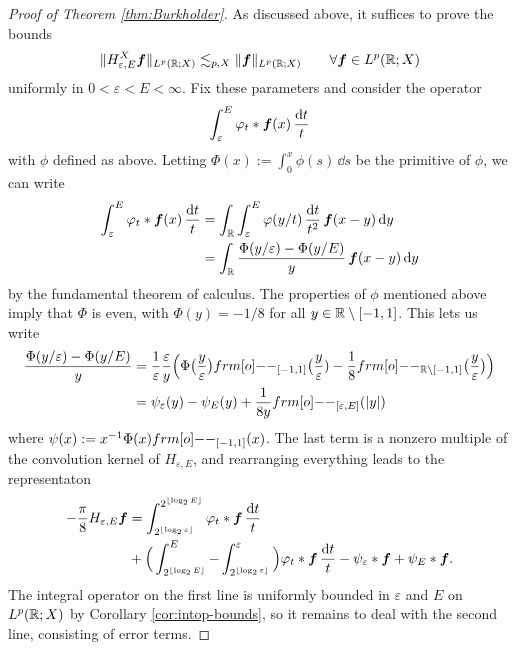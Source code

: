 \begin{proof}[Proof of Theorem \ref{thm:Burkholder}]
  As discussed above, it suffices to prove the bounds
  \begin{equation}\label{eq:HT-unifbds}
    \|H^{X}_{\varepsilon, E} \bm{f}\|_{L^p(\mathbb{R};X)} \lesssim_{p,X} \|\bm{f}\|_{L^p(\mathbb{R};X)} \qquad \forall \bm{f} \in L^p(\mathbb{R};X)
  \end{equation}
  uniformly in $0 < \varepsilon < E < \infty$.
  Fix these parameters and consider the operator
  \begin{equation*}
    \int_{\varepsilon}^{E} \varphi_{t} \ast \bm{f}(x) \, \frac{\mathrm{d} t}{t}
  \end{equation*}
  with $\phi$ defined as above.
  Letting $\Phi(x) := \int_{0}^{x} \phi(s) \, \dd s$ be the primitive of $\phi$, we can write
  \begin{equation*}
    \begin{aligned}
    \int_{\varepsilon}^{E} \varphi_{t} \ast \bm{f}(x) \, \frac{\mathrm{d} t}{t}
    &= \int_{\mathbb{R}} \int_{\varepsilon}^{E} \varphi(y/t) \, \frac{\mathrm{d} t}{t^{2}} \, \bm{f}(x - y) \, \mathrm{d} y \\
    &= \int_{\mathbb{R}} \frac{\Phi(y/\varepsilon) - \Phi(y/E) }{y} \, \bm{f}(x-y) \, \mathrm{d} y
  \end{aligned}
\end{equation*}
by the fundamental theorem of calculus.
The properties of $\phi$ mentioned above imply that $\Phi$ is even, with $\Phi(y) = -1/8$ for all $y \in \mathbb{R} \setminus [-1,1]$.
This lets us write
\begin{equation*}
  \begin{aligned}
    \frac{\Phi(y/\varepsilon) - \Phi(y/E) }{y}
    &= \frac{1}{\varepsilon} \frac{\varepsilon}{y} \Big( \Phi\big(\frac{y}{\varepsilon}\big) \1_{[-1,1]}\big(\frac{y}{\varepsilon}) - \frac{1}{8}\1_{\R \sm [-1,1]}\big(\frac{y}{\varepsilon}\big) \Big) \\
    &= \psi_{\varepsilon}(y) - \psi_{E}(y) + \frac{1}{8y}\1_{[\varepsilon, E]}(|y|)
  \end{aligned}
\end{equation*}
where $\psi(x) := x^{-1} \Phi(x) \1_{[-1,1]}(x)$.
The last term is a nonzero multiple of the convolution kernel of $H_{\varepsilon, E}$, and rearranging everything leads to the representaton
\begin{equation*}
  \begin{aligned}
  -\frac{\pi}{8} H_{\varepsilon, E}\bm{f}
  &= \int_{2^{\lfloor \log_{2} \varepsilon \rfloor}}^{2^{\lfloor \log_{2} E \rfloor}} \varphi_{t} \ast \bm{f} \, \frac{\mathrm{d} t}{t} \\
  &+ \Big( \int_{2^{\lfloor \log_{2} E \rfloor}}^{E} - \int_{2^{\lfloor \log_{2} \varepsilon \rfloor}}^{\varepsilon} \Big) \varphi_{t} \ast \bm{f} \, \frac{\mathrm{d} t}{t} - \psi_{\varepsilon} \ast \bm{f} + \psi_{E} \ast \bm{f}.
\end{aligned}
\end{equation*}
The integral operator on the first line is uniformly bounded in $\varepsilon$ and $E$ on $L^p(\mathbb{R};X)$ by Corollary \ref{cor:intop-bounds}, so it remains to deal with the second line, consisting of error terms.


\end{proof}
